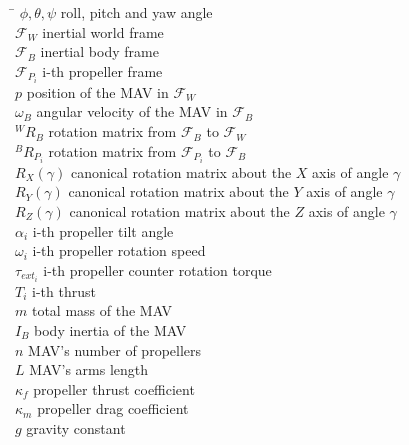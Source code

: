 \begin{tabbing}
 \hspace*{1.6cm} \= \kill
  $\phi, \theta, \psi$    \> roll, pitch and yaw angle \\[0.5ex]
  $\mathcal{F}_{W}$   \> inertial world frame \\[0.5ex]
  $\mathcal{F}_{B}$   \> inertial body frame \\[0.5ex]
  $\mathcal{F}_{P_{i}}$   \> i-th propeller frame \\[0.5ex]
  $p$   \> position of the MAV in $\mathcal{F}_{W}$ \\[0.5ex]
  $\omega_{B}$    \> angular velocity of the MAV in $\mathcal{F}_{B}$\\[0.5ex]
  $^{W}R_{B}$   \> rotation matrix from $\mathcal{F}_{B}$ to $\mathcal{F}_{W}$\\[0.5ex]
  $^{B}R_{P_{i}}$  \> rotation matrix from $\mathcal{F}_{P_{i}}$ to $\mathcal{F}_{B}$\\[0.5ex]
  $R_{X}(\gamma)$   \> canonical rotation matrix about the $X$ axis of angle $\gamma$\\[0.5ex]
  $R_{Y}(\gamma)$   \> canonical rotation matrix about the $Y$ axis of angle $\gamma$\\[0.5ex]
  $R_{Z}(\gamma)$   \> canonical rotation matrix about the $Z$ axis of angle $\gamma$\\[0.5ex]
  $\alpha_{i}$    \> i-th propeller tilt angle\\[0.5ex]
  $\omega_{i}$    \> i-th propeller rotation speed\\[0.5ex]
  $\tau_{ext_{i}}$    \> i-th propeller counter rotation torque\\[0.5ex]
  $T_{i}$    \> i-th thrust\\[0.5ex]
  $m$    \> total mass of the MAV\\[0.5ex]
  $I_{B}$    \> body inertia of the MAV\\[0.5ex]
  $n$    \> MAV's number of propellers\\[0.5ex]
  $L$    \> MAV's arms length\\[0.5ex]
  $\kappa_{f}$    \> propeller thrust coefficient\\[0.5ex]
  $\kappa_{m}$    \> propeller drag coefficient\\[0.5ex]
  $g$    \> gravity constant\\[0.5ex]
\end{tabbing}


